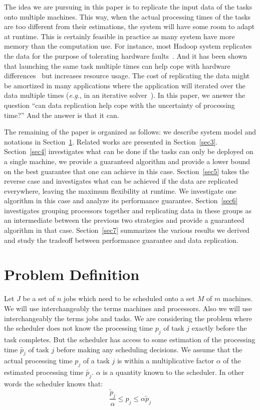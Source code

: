 \documentclass[10pt, conference, compsocconf]{IEEEtran}
\begin{document}
The idea we are pursuing in this paper is to replicate the input data
of the tasks onto multiple machines. This way, when the actual
processing times of the tasks are too different from their
estimations, the system will have some room to adapt at runtime. This
is certainly feasible in practice as many system have more memory than
the computation use. For instance, most Hadoop system replicates the
data for the purpose of tolerating hardware
faults~\cite{White:2009:HDG:1717298}. And it has been shown that
launching the same task multiple times can help cope with hardware
differences~\cite{DBLP:journals/corr/WangJW14} but increases resource
usage. The cost of replicating the data might be amortized in many
applications where the application will iterated over the data
multiple times ({\em e.g.}, in an iterative solver~\cite{Zhou12-P2S2,Zhou12-Cluster}). In this paper, we
answer the question ``can data replication help cope with the
uncertainty of processing time?''  And the answer is that it can.

The remaining of the paper is organized as follows: we describe system
model and notations in Section~\ref{sec2}. Related works are presented
in Section~\ref{sec3}.  Section~\ref{sec4} investigates what can be
done if the tasks can only be deployed on a single machine, we
provide a guaranteed algorithm and provide a lower bound on the best
guarantee that one can achieve in this case. Section~\ref{sec5} takes
the reverse case and investigates what can be achieved if the data are
replicated everywhere, leaving the maximum flexibility at runtime. We
investigate one algorithm in this case and analyze its performance
guarantee. Section~\ref{sec6} investigates grouping processors
together and replicating data in these groups as an intermediate
between the previous two strategies and provide a guaranteed algorithm
in that case. Section~\ref{sec7} summarizes the various results we
derived and study the tradeoff between performance guarantee and data
replication.

\section{Problem Definition}\label{sec2}
Let $J$ be a set of $n$ jobs which need to be scheduled onto a set $M$
of $m$ machines. We will use interchangeably the terms machines and
processors. Also we will use interchangeably the terms jobs and
tasks. We are considering the problem where the scheduler does not
know the processing time $p_j$ of task $j$ exactly before the task
completes.  But the scheduler has access to some estimation of the
processing time $\tilde{p_j}$ of task $j$ before making any scheduling
decisions. We assume that the actual processing time $p_j$ of a task
$j$ is within a multiplicative factor $\alpha$ of the estimated
processing time $\tilde{p_j}$. $\alpha$ is a quantity known to the
scheduler. In other words the scheduler knows that:
 \begin{equation}\label{eq1}
\frac{\tilde{p}_{j}}{\alpha}\leq p_{j}\leq \alpha \tilde{p}_{j}
\end{equation}
\end{document}
